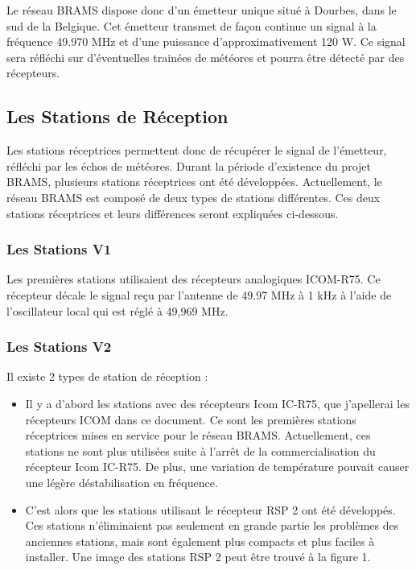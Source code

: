 \documentclass[11pt]{article}
\begin{document}
Le réseau BRAMS dispose donc d'un émetteur unique situé à Dourbes, dans le sud de la Belgique.
Cet émetteur transmet de façon continue un signal à la fréquence 49.970 MHz et d'une puissance d'approximativement 120 W.
Ce signal sera réfléchi sur d'éventuelles trainées de météores et pourra être détecté par des récepteurs.

\subsection{Les Stations de Réception}
Les stations réceptrices permettent donc de récupérer le signal de l'émetteur, réfléchi par les échos de météores.
Durant la période d'existence du projet BRAMS, plusieurs stations réceptrices ont été développées.
Actuellement, le réseau BRAMS est composé de deux types de stations différentes.
Ces deux stations réceptrices et leurs différences seront expliquées ci-dessous.

\subsubsection{Les Stations V1}

Les premières stations utilisaient des récepteurs analogiques ICOM-R75.
Ce récepteur décale le signal reçu par l'antenne de 49.97 MHz à 1 kHz à l'aide de l'oscillateur local qui est réglé à 49,969 MHz.

\subsubsection{Les Stations V2}
Il existe 2 types de station de réception :
\begin{itemize}
    \item Il y a d'abord les stations avec des récepteurs Icom IC-R75, que j'apellerai les récepteurs ICOM dans ce document.
          Ce sont les premières stations réceptrices mises en service pour le réseau BRAMS.
          Actuellement, ces stations ne sont plus utilisées suite à l'arrêt de la commercialisation du récepteur Icom IC-R75.
          De plus, une variation de température pouvait causer une légère déstabilisation en fréquence.
    \item C'est alors que les stations utilisant le récepteur RSP 2 ont été développés.
          Ces stations n'éliminaient pas seulement en grande partie les problèmes des anciennes stations, mais sont également plus compacts et plus faciles à installer.
          Une image des stations RSP 2 peut être trouvé à la figure 1.
\end{itemize}
\end{document}
